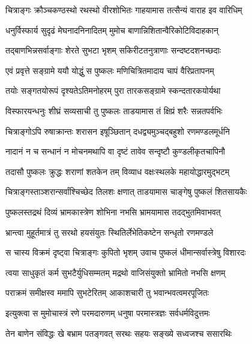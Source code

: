 

\twolineshloka
{चित्राङ्गः क्रौञ्चकण्ठस्थो रथस्थो वीरशोभितः}
{गाहयामास तत्सैन्यं वाराह इव वारिधिम्}%

\twolineshloka
{धनुर्विस्फार्य सुदृढं मेघनादनिनादितम्}
{मुमोच बाणान्निशितान्वैरिकोटिविदाहकान्}%

\twolineshloka
{तद्बाणभिन्नसर्वाङ्गाः शेरते सुभटा भृशम्}
{सकिरीटतनुत्राणाः सन्दष्टदशनच्छदाः}%

\twolineshloka
{एवं प्रवृत्ते सङ्ग्रामे ययौ योद्धुं स पुष्कलः}
{मणिचित्रितमादाय चापं वैरिप्रतापनम्}%

\twolineshloka
{तयोः सङ्गतयोरूपं दृश्यतेऽतिमनोहरम्}
{पुरा तारकसङ्ग्रामे स्कन्दतारकयोर्यथा}%

\twolineshloka
{विस्फारयन्धनुः शीघ्रं सव्यसाची तु पुष्कलः}
{ताडयामास तं क्षिप्रं शरैः सन्नतपर्वभिः}%

\twolineshloka
{चित्राङ्गोऽपि रुषाक्रान्तः शरासन इषूञ्छितान्}
{दधद्व्यमुञ्चद्बहुशो रणमण्डलमूर्धनि}%

\twolineshloka
{नादानं न च सन्धानं न मोचनमथापि वा}
{दृष्टं तावेव सन्दृष्टौ कुण्डलीकृतचापिनौ}%

\twolineshloka
{तदासौ पुष्कलः क्रुद्धः शराणां शतकेन तम्}
{विव्याध वक्षःस्थलके महायोद्धारमुद्भटम्}%

\twolineshloka
{चित्राङ्गस्ताञ्शरान्सर्वांश्चिच्छेद तिलशः क्षणात्}
{ताडयामास चाङ्गेषु पुष्कलं शितसायकैः}%

\twolineshloka
{पुष्कलस्तद्रथं दिव्यं भ्रामकास्त्रेण शोभिना}
{नभसि भ्रामयामास तदद्भुतमिवाभवत्}%

\twolineshloka
{भ्रान्त्वा मुहूर्तमात्रं तु सरथो हयसंयुतः}
{स्थितिर्लेभेतिकष्टेन सन्धृतो रणमण्डले}%

\twolineshloka
{स चास्य विक्रमं दृष्ट्वा चित्राङ्गः कुपितो भृशम्}
{उवाच पुष्कलं धीमान्सर्वास्त्रेषु विशारदः}%


\twolineshloka
{त्वया साधुकृतं कर्म सुभटैर्युधिसम्मतम्}
{मद्रथो वाजिसंयुक्तो भ्रामितो नभसि क्षणम्}%

\twolineshloka
{पराक्रमं समीक्षस्व ममापि सुभटेरितम्}
{आकाशचारी तु भवान्भवत्वमरपूजितः}%

\twolineshloka
{इत्युक्त्वा स मुमोचास्त्रं रणे परमदारुणम्}
{धनुषा परमास्त्रज्ञः सर्वधर्मविदुत्तमः}%

\twolineshloka
{तेन बाणेन संविद्धः खे बभ्राम पतङ्गवत्}
{सरथः सहयः सङ्ख्ये सध्वजश्च ससारथिः}%

